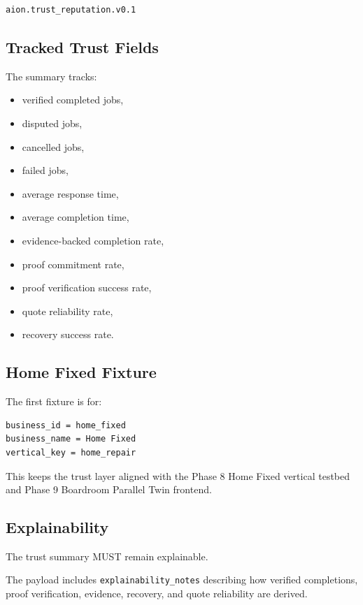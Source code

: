 \begin{verbatim}
aion.trust_reputation.v0.1
\end{verbatim}

\subsection{Tracked Trust Fields}

The summary tracks:

\begin{itemize}
  \item verified completed jobs,
  \item disputed jobs,
  \item cancelled jobs,
  \item failed jobs,
  \item average response time,
  \item average completion time,
  \item evidence-backed completion rate,
  \item proof commitment rate,
  \item proof verification success rate,
  \item quote reliability rate,
  \item recovery success rate.
\end{itemize}

\subsection{Home Fixed Fixture}

The first fixture is for:

\begin{verbatim}
business_id = home_fixed
business_name = Home Fixed
vertical_key = home_repair
\end{verbatim}

This keeps the trust layer aligned with the Phase 8 Home Fixed vertical testbed and Phase 9 Boardroom Parallel Twin frontend.

\subsection{Explainability}

The trust summary MUST remain explainable.

The payload includes \texttt{explainability\_notes} describing how verified completions, proof verification, evidence, recovery, and quote reliability are derived.

